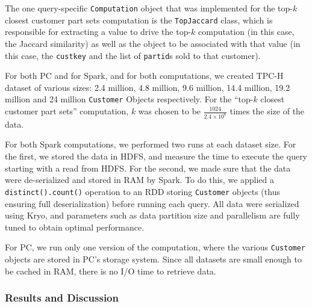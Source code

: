 \noindent The one query-specific \texttt{Computation} object that was implemented for the top-$k$ 
closest customer part sets computation is the \texttt{TopJaccard} class, which
is responsible for extracting a value to drive the top-$k$ computation (in this case, the Jaccard similarity) as well
as the object to be associated with that value (in this case, the \texttt{custkey} and the list of 
\texttt{partid}s sold to that customer).

For both PC and for Spark, and for both computations, we created 
TPC-H dataset of various sizes: 2.4 million,
4.8 million, 9.6 million, 14.4 million, 19.2 million and 24 million
\texttt{Customer} Objects respectively.  For the ``top-$k$
closest customer part sets'' computation, $k$ was chosen to be $\frac{1024}{2.4 \times 10^6}$ times the size
of the data.

For both Spark computations, we performed two runs at each dataset size.
For the first, we stored the data in HDFS, and measure the time to execute the query starting with a
read from HDFS.
For the second, we made sure that the data were de-serialized and stored in RAM by Spark.
To do this, we applied a \texttt{distinct().count()} operation to
an RDD storing \texttt{Customer} objects (thus ensuring full deserialization) before running each query.
All data were
serialized using Kryo, and parameters such as data partition size and parallelism are fully tuned to obtain
optimal performance. 

For PC, we run only one version of the computation, where the various \texttt{Customer} objects are stored in
PC's storage system.  Since all datasets are small enough to be cached in RAM, there is no I/O time to
retrieve data.

\subsubsection{Results and Discussion}

